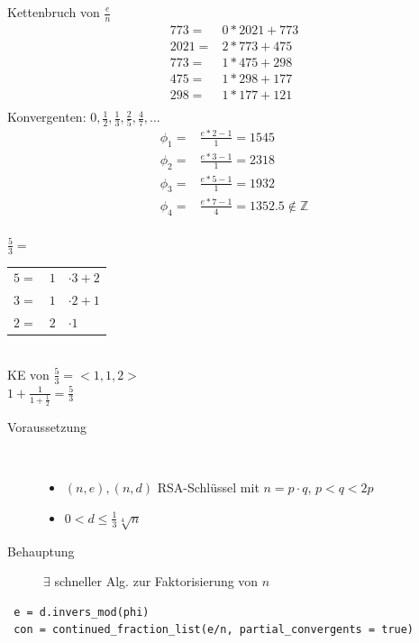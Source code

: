 \documentclass[landscape,twocolumn,a4paper]{article}
\newcommand{\Oneover}[1]{\frac{1}{#1}} %
\begin{document}
\begin{multicols}{2}
Kettenbruch von $\frac{e}{n}$\\
\begin{align*}
773 =& 0 * 2021 + 773 \\
2021 =& 2*773 + 475 \\
773 =& 1*475 + 298 \\
475 =& 1*298 + 177 \\
298 =& 1*177 + 121 \\
\end{align*}
Konvergenten: $0, \frac{1}{2}, \frac{1}{3}, \frac{2}{5}, \frac{4}{7}, \ldots$
\begin{align*}
\phi_1 =& \frac{e*2-1}{1} = 1545\\
\phi_2 =& \frac{e*3-1}{1} = 2318\\
\phi_3 =& \frac{e*5-1}{1} = 1932\\
\phi_4 =& \frac{e*7-1}{4} = 1352.5 \notin \mathbb{Z}\\
\end{align*}
\end{multicols}
$\frac{5}{3}=$\\
\begin{tabular}{l|c|l}\cline{2-1}
 $5=$&$1$&$\cdot3+2$\\
 $3=$&$1$&$\cdot2+1$\\
 $2=$&$2$&$\cdot1$\\\cline{2-1}
\end{tabular}\\\linebreak
{\color{red}KE von $\frac{5}{3}=<1,1,2>$}\\
$1+\frac{1}{1+\frac{1}{2}}=\frac{5}{3}$\\
\begin{description}
 \item [Voraussetzung] \hfill \\
    \begin{itemize}
      \item $(n,e),(n,d)$ RSA-Schlüssel mit $n=p\cdot q$, $p<q<2p$
      \item $0<d\leqslant\Oneover{3}\sqrt[4]{n}$
    \end{itemize}
 \item [Behauptung] $\exists$ schneller Alg. zur Faktorisierung von $n$
\end{description}
\begin{lstlisting}
 e = d.invers_mod(phi)
 con = continued_fraction_list(e/n, partial_convergents = true)
\end{lstlisting}
\end{document}
